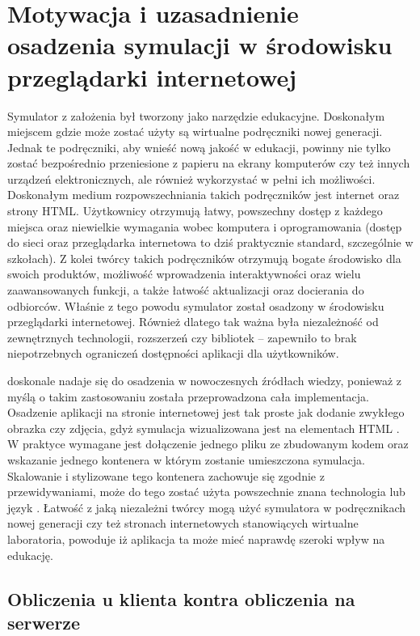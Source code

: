 \section{Motywacja i uzasadnienie osadzenia symulacji w środowisku przeglądarki internetowej}

Symulator \en z założenia był tworzony jako narzędzie edukacyjne. Doskonałym
miejscem gdzie może zostać użyty są wirtualne podręczniki nowej generacji.
Jednak te podręczniki, aby wnieść nową jakość w edukacji, powinny nie tylko
zostać bezpośrednio przeniesione z papieru na ekrany komputerów czy też innych
urządzeń elektronicznych, ale również wykorzystać w pełni ich możliwości.
Doskonałym medium rozpowszechniania takich podręczników jest internet oraz
strony HTML. Użytkownicy otrzymują łatwy, powszechny dostęp z każdego miejsca
oraz niewielkie wymagania wobec komputera i oprogramowania (dostęp do sieci oraz
przeglądarka internetowa to dziś praktycznie standard, szczególnie w szkołach).
Z kolei twórcy takich podręczników otrzymują bogate środowisko dla swoich
produktów, możliwość wprowadzenia interaktywności oraz wielu zaawansowanych
funkcji, a także łatwość aktualizacji oraz docierania do odbiorców.  Właśnie z
tego powodu symulator \en został osadzony w środowisku przeglądarki
internetowej. Również dlatego tak ważna była niezależność od zewnętrznych
technologii, rozszerzeń czy bibliotek -- zapewniło to brak niepotrzebnych
ograniczeń dostępności aplikacji dla użytkowników.

\en doskonale nadaje się do osadzenia w nowoczesnych źródłach wiedzy, ponieważ z
myślą o takim zastosowaniu została przeprowadzona cała implementacja. Osadzenie
aplikacji na stronie internetowej jest tak proste jak dodanie zwykłego obrazka
czy zdjęcia, gdyż symulacja wizualizowana jest na elementach HTML . W
praktyce wymagane jest dołączenie jednego pliku ze zbudowanym kodem \en oraz
wskazanie jednego kontenera  w którym zostanie umieszczona symulacja.
Skalowanie i stylizowane tego kontenera zachowuje się zgodnie z przewidywaniami,
może do tego zostać użyta powszechnie znana technologia  lub język \js.
Łatwość z jaką niezależni twórcy mogą użyć symulatora \en w podręcznikach nowej
generacji czy też stronach internetowych stanowiących wirtualne laboratoria,
powoduje iż aplikacja ta może mieć naprawdę szeroki wpływ na edukację.

\subsection{Obliczenia u klienta kontra obliczenia na serwerze}

